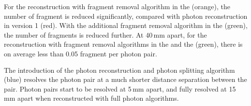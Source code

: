 

For the reconstruction with fragment removal algorithm in the \ECAL (orange), the number of fragment is reduced significantly, compared with photon reconstruction in \pandora version 1 (red). With the additional fragment removal algorithm in the \HCAL (green), the number of fragments is reduced further. At 40\,mm apart, for the reconstruction with fragment removal algorithms in the \ECAL and the \HCAL  (green), there is on average less than 0.05 fragment per photon pair.

The introduction of the photon reconstruction and photon splitting algorithm (blue) resolves the photon pair at a much shorter distance separation between the pair. Photon pairs start to be resolved at 5\,mm apart, and fully resolved at 15\,mm apart when reconstructed with full photon algorithms.


